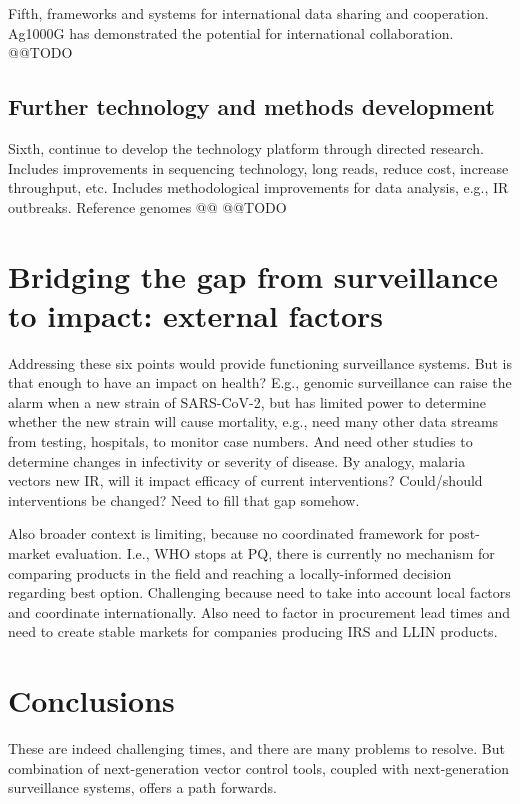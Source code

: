 \documentclass[a4paper,11pt,abstracton,hidelinks]{scrartcl}
\begin{document}
Fifth, frameworks and systems for international data sharing and cooperation.
%
Ag1000G has demonstrated the potential for international collaboration.
%
@@TODO


\subsection{Further technology and methods development}


Sixth, continue to develop the technology platform through directed research.
%
Includes improvements in sequencing technology, long reads, reduce cost, increase throughput, etc.
%
Includes methodological improvements for data analysis, e.g., IR outbreaks.
%
Reference genomes @@
@@TODO


\section{Bridging the gap from surveillance to impact: external factors}\label{sec:external}


Addressing these six points would provide functioning surveillance systems.
%
But is that enough to have an impact on health?
%
E.g., genomic surveillance can raise the alarm when a new strain of SARS-CoV-2, but has limited power to determine whether the new strain will cause mortality, e.g., need many other data streams from testing, hospitals, to monitor case numbers.
And need other studies to determine changes in infectivity or severity of disease.
%
By analogy, malaria vectors new IR, will it impact efficacy of current interventions?
Could/should interventions be changed?
Need to fill that gap somehow.


Also broader context is limiting, because no coordinated framework for post-market evaluation.
%
I.e., WHO stops at PQ, there is currently no mechanism for comparing products in the field and reaching a locally-informed decision regarding best option.
%
Challenging because need to take into account local factors and coordinate internationally.
%
Also need to factor in procurement lead times and need to create stable markets for companies producing IRS and LLIN products.


\section{Conclusions}\label{sec:conclusions}


These are indeed challenging times, and there are many problems to resolve.
But combination of next-generation vector control tools, coupled with next-generation surveillance systems, offers a path forwards.
\end{document}
